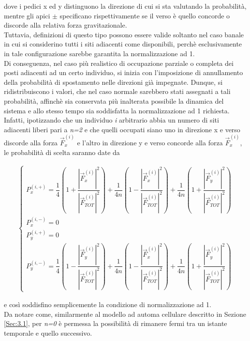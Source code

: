 \documentclass[letterpaper,10pt]{article}
\begin{document}
dove i pedici x ed y distinguono la direzione di cui si sta valutando la probabilità, mentre gli apici $\pm$ specificano rispettivamente se il verso è quello concorde o discorde alla relativa forza gravitazionale.
\\ Tuttavia, definizioni di questo tipo possono essere valide soltanto nel caso banale in cui si considerino tutti i siti adiacenti come disponibili, perchè esclusivamente in tale configurazione sarebbe garantita la normalizzazione ad 1.
\\ Di conseguenza, nel caso più realistico di occupazione parziale o completa dei posti adiacenti ad un certo individuo, si inizia con l'imposizione di annullamento della probabilità di spostamento nelle direzioni già impegnate. Dunque, si ridistribuiscono i valori, che nel caso normale sarebbero stati assegnati a tali probabilità, affinchè sia conservata più inalterata possibile la dinamica del sistema e allo stesso tempo sia soddisfatta la normalizzazione ad 1 richiesta.
\\ Infatti, ipotizzando che un individuo \textit{i} arbitrario abbia un numero di siti adiacenti liberi pari a \textit{n=2} e che quelli occupati siano uno in direzione x e verso discorde alla forza $\vec{F}_x^{(i)}$ e l'altro in direzione y e verso concorde alla forza $\vec{F}_x^{(i)}$, le probabilità di scelta saranno date da

\begin{equation}
\begin{aligned}
\begin{cases}
P_x^{(i, +)} = \dfrac{1}{4} \left ( 1 + \dfrac{|\vec{F}_x^{(i)}|^2}{|\vec{F}_{TOT}^{(i)}|^2} \right ) + \dfrac{1}{4n} \left ( 1 - \dfrac{|\vec{F}_x^{(i)}|^2}{|\vec{F}_{TOT}^{(i)}|^2} \right ) + \dfrac{1}{4n} \left ( 1 + \dfrac{|\vec{F}_y^{(i)}|^2}{|\vec{F}_{TOT}^{(i)}|^2} \right ) \\
P_x^{(i, -)} = 0 \\
P_y^{(i, +)} = 0 \\
P_y^{(i, -)} = \dfrac{1}{4} \left ( 1 - \dfrac{|\vec{F}_y^{(i)}|^2}{|\vec{F}_{TOT}^{(i)}|^2} \right ) + \dfrac{1}{4n} \left ( 1 - \dfrac{|\vec{F}_x^{(i)}|^2}{|\vec{F}_{TOT}^{(i)}|^2} \right ) + \dfrac{1}{4n} \left ( 1 + \dfrac{|\vec{F}_y^{(i)}|^2}{|\vec{F}_{TOT}^{(i)}|^2} \right )
\end{cases}
\end{aligned}
\label{Eq:9}
\end{equation}

e così soddisfino semplicemente la condizione di normalizzazione ad 1.
\\ Da notare come, similarmente al modello ad automa cellulare descritto in Sezione \ref{Sec:3.1}, per \textit{n=0} è permessa la possibilità di rimanere fermi tra un istante temporale e quello successivo.
\end{document}
